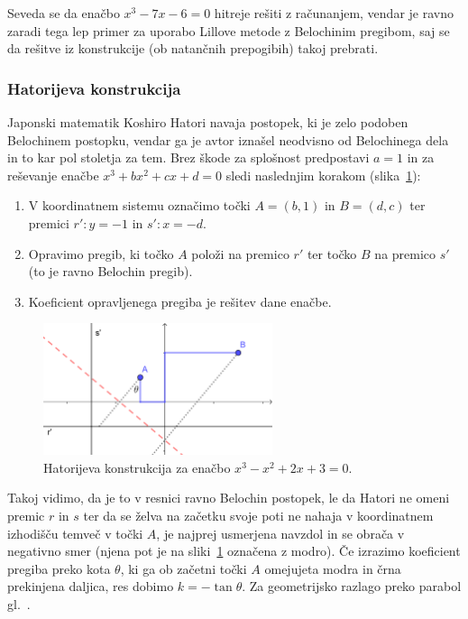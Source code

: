 Seveda se da enačbo $x^3 - 7x - 6 = 0$ hitreje rešiti z računanjem, vendar je ravno zaradi tega lep primer za uporabo Lillove metode z Belochinim pregibom, saj se da rešitve iz konstrukcije (ob natančnih prepogibih) takoj prebrati.

\subsubsection{Hatorijeva konstrukcija}

Japonski matematik Koshiro Hatori navaja postopek, ki je zelo podoben Belochinem postopku, vendar ga je avtor iznašel neodvisno od Belochinega dela in to kar pol stoletja za tem. Brez škode za splošnost predpostavi $a = 1$ in za reševanje enačbe $x^3 + bx^2 + cx + d = 0$ sledi naslednjim korakom (slika~\ref{fig:hatori}):
\begin{enumerate}
    \item V koordinatnem sistemu označimo točki $A = (b, 1)$ in $B = (d, c)$ ter premici $r': y = -1$ in $s': x = -d$.
    \item Opravimo pregib, ki točko $A$ položi na premico $r'$ ter točko $B$ na premico $s'$ (to je ravno Belochin pregib).
    \item Koeficient opravljenega pregiba je rešitev dane enačbe.
\end{enumerate}

\begin{figure}[h]
    \centering
    \includegraphics[width=0.6\textwidth]{images/kubična enačba/hatori.png}
    \caption[Hatorijeva konstrukcija]{Hatorijeva konstrukcija za enačbo $x^3 - x^2 + 2x + 3 = 0$.}
    \label{fig:hatori}
\end{figure}

Takoj vidimo, da je to v resnici ravno Belochin postopek, le da Hatori ne omeni premic $r$ in $s$ ter da se želva na začetku svoje poti ne nahaja v koordinatnem izhodišču temveč v točki $A$, je najprej usmerjena navzdol in se obrača v negativno smer (njena pot je na sliki~\ref{fig:hatori} označena z modro). Če izrazimo koeficient pregiba preko kota $\theta$, ki ga ob začetni točki $A$ omejujeta modra in črna prekinjena daljica, res dobimo $k = - \tan \theta$. Za geometrijsko razlago preko parabol gl.~\cite{hatori2003}.

